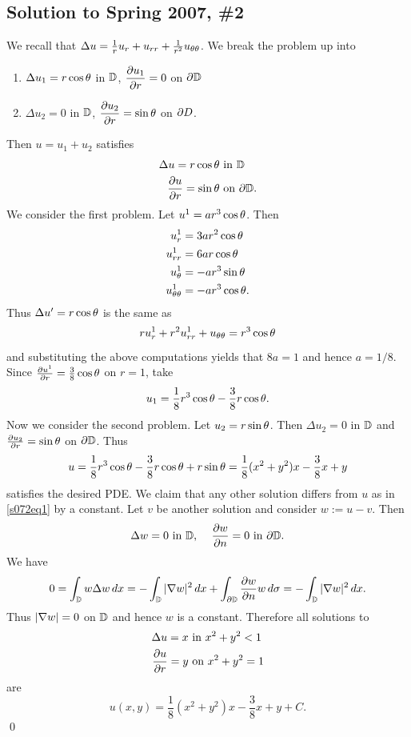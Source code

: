 \subsection*{Solution to Spring 2007, \#2}\label{s072}
We recall that $\Delta u = \frac{1}{r}u_{r} + u_{rr} + \frac{1}{r^{2}}u_{\theta\theta}$.
We break the problem up into
\begin{enumerate}[$(1)$]
\item $\Delta u_{1} = r\cos \theta$ in $\mathbb{D}$, $\displaystyle \frac{\partial u_{1}}{\partial r} = 0$ on $\partial \mathbb{D}$
\item $\Delta u_{2} = 0$ in $\mathbb{D}$, $\displaystyle \frac{\partial u_{2}}{\partial r} = \sin \theta$ on $\partial D$.
\end{enumerate}
Then $u = u_{1} + u_{2}$ satisfies
\begin{align*}
\Delta u = r\cos \theta & \text{ in $\mathbb{D}$}\\
\frac{\partial u}{\partial r} = \sin \theta & \text{ on $\partial \mathbb{D}$.}
\end{align*}
We consider the first problem. Let $u^{1} = ar^{3}\cos\theta$. Then
\begin{align*}
u_{r}^{1} &= 3ar^{2}\cos\theta\\
u_{rr}^{1} &= 6ar\cos\theta\\
u_{\theta}^{1} &= -ar^{3}\sin\theta\\
u_{\theta\theta}^{1} &= -ar^{3}\cos\theta.
\end{align*}
Thus $\Delta u' = r\cos\theta$ is the same as
$$ru_{r}^{1} + r^{2}u_{rr}^{1} + u_{\theta\theta} = r^{3}\cos\theta$$
and substituting the above computations yields that $8a = 1$ and hence $a = 1/8$.
Since $\frac{\partial u^{1}}{\partial r} = \frac{3}{8}\cos\theta$ on $r = 1$,
take $$u_{1} = \frac{1}{8}r^{3}\cos\theta - \frac{3}{8}r\cos\theta.$$
Now we consider the second problem. Let $u_{2} = r\sin\theta$. Then $\Delta u_{2} = 0$ in $\mathbb{D}$ and $\frac{\partial u_{2}}{\partial r} = \sin\theta$ on $\partial\mathbb{D}$.
Thus
\begin{align}\label{s072eq1}
u = \frac{1}{8}r^{3}\cos\theta - \frac{3}{8}r\cos\theta + r\sin\theta = \frac{1}{8}(x^{2} + y^{2})x - \frac{3}{8}x + y
\end{align}
satisfies the desired PDE. We claim that any other solution differs from $u$ as in \eqref{s072eq1} by a constant. Let $v$ be another solution and consider
$w := u - v$. Then
$$\Delta w = 0 \text{ in $\mathbb{D}$, }\quad \frac{\partial w}{\partial n} = 0 \text{ in $\partial\mathbb{D}$.}$$
We have
$$0 = \int_{\mathbb{D}}w\Delta w\, dx = -\int_{\mathbb{D}}|\nabla w|^{2}\, dx + \int_{\partial\mathbb{D}}\frac{\partial w}{\partial n}w\, d\sigma = -\int_{\mathbb{D}}|\nabla w|^{2}\, dx.$$
Thus $|\nabla w| = 0$ on $\mathbb{D}$ and hence $w$ is a constant. Therefore all solutions to
\begin{align*}
\Delta u = x & \text{ in } x^{2} + y^{2} < 1\\
\frac{\partial u}{\partial r} = y & \text{ on } x^{2} + y^{2} = 1
\end{align*}
are $$u(x, y) = \frac{1}{8}(x^{2} + y^{2})x - \frac{3}{8}x + y + C.$$
\hfill\qed

